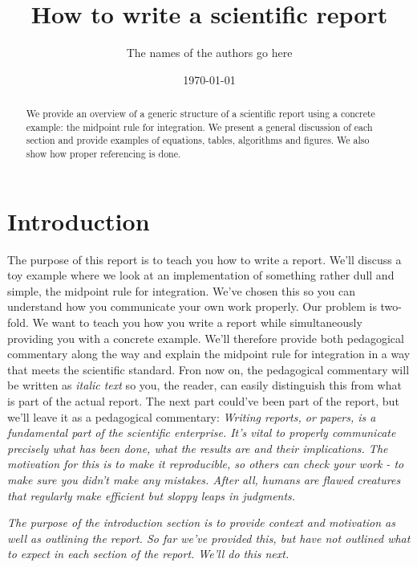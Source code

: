\documentclass[english,notitlepage, reprint]{revtex4-1}  %
\begin{document}
\title{How to write a scientific report}      %
\author{The names of the authors go here}          %
\date{\today}                             %
\noaffiliation                            %

\begin{abstract}
	We provide an overview of a generic structure of a scientific report using a concrete example: the midpoint rule for integration. We present a general discussion of each section and provide examples of equations, tables, algorithms and figures. We also show how proper referencing is done.
\end{abstract}
\maketitle 

\section{Introduction}
The purpose of this report is to teach you how to write a report. We'll discuss a toy example where we look at an implementation of something rather dull and simple, the midpoint rule for integration. We've chosen this so you can understand how you communicate your own work properly. Our problem is two-fold. We want to teach you how you write a report while simultaneously providing you with a concrete example. We'll therefore provide both pedagogical commentary along the way and explain the midpoint rule for integration in a way that meets the scientific standard. Fron now on, the pedagogical commentary will be written as \textit{italic text} so you, the reader, can easily distinguish this from what is part of the actual report. The next part could've been part of the report, but we'll leave it as a pedagogical commentary:
\textit{Writing reports, or papers, is a fundamental part of the scientific enterprise. It's vital to properly communicate precisely what has been done, what the results are and their implications. The motivation for this is to make it reproducible, so others can check your work - to make sure you didn't make any mistakes. After all, humans are flawed creatures that regularly make efficient but sloppy leaps in judgments.}

\textit{The purpose of the introduction section is to provide context and motivation as well as outlining the report. So far we've provided this, but have not outlined what to expect in each section of the report. We'll do this next.}
\end{document}
